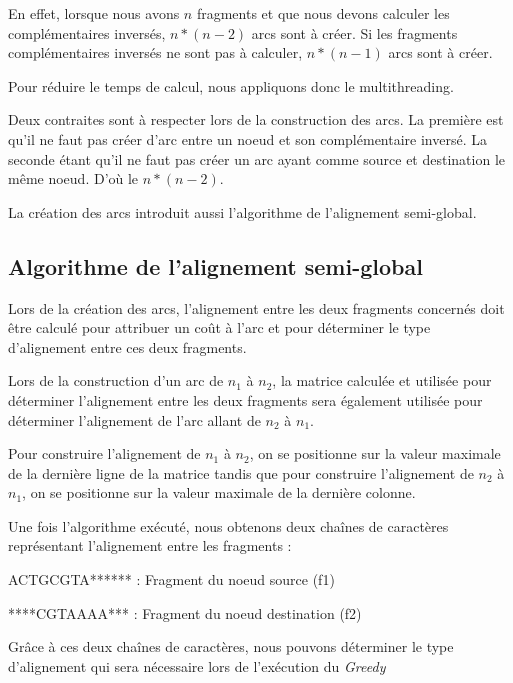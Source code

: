\documentclass[12pt,a4paper,final]{article}
\begin{document}
En effet, lorsque nous avons $n$ fragments et que nous devons calculer les complémentaires inversés, $n*(n-2)$ arcs sont à créer.  Si les fragments complémentaires inversés ne sont pas à calculer, $n*(n-1)$ arcs sont à créer.\medskip

Pour réduire le temps de calcul, nous appliquons donc le multithreading.\medskip

Deux contraites sont à respecter lors de la construction des arcs.  La première est qu'il ne faut pas créer d'arc entre un noeud et son complémentaire inversé.  La seconde étant qu'il ne faut pas créer un arc ayant comme source et destination le même noeud.  D'où le $n*(n-2)$.\medskip

La création des arcs introduit aussi l'algorithme de l'alignement semi-global.\medskip

\subsection{Algorithme de l'alignement semi-global}

Lors de la création des arcs, l'alignement entre les deux fragments concernés doit être calculé pour attribuer un coût à l'arc et pour déterminer le type d'alignement entre ces deux fragments.\medskip

Lors de la construction d'un arc de $n_1$ à $n_2$, la matrice calculée et utilisée pour déterminer l'alignement entre les deux fragments sera également utilisée pour déterminer l'alignement de l'arc allant de $n_2$ à $n_1$.\medskip

Pour construire l'alignement de $n_1$ à $n_2$, on se positionne sur la valeur maximale de la dernière ligne de la matrice tandis que pour construire l'alignement de $n_2$ à $n_1$, on se positionne sur la valeur maximale de la dernière colonne.\medskip

Une fois l'algorithme exécuté, nous obtenons deux chaînes de caractères représentant l'alignement entre les fragments : \medskip

ACTGCGTA****** : Fragment du noeud source (f1)\medskip

****CGTAAAA*** : Fragment du noeud destination (f2) \medskip


Grâce à ces deux chaînes de caractères, nous pouvons déterminer le type d'alignement qui sera nécessaire lors de l'exécution du \textit{Greedy}\medskip

\end{document}
